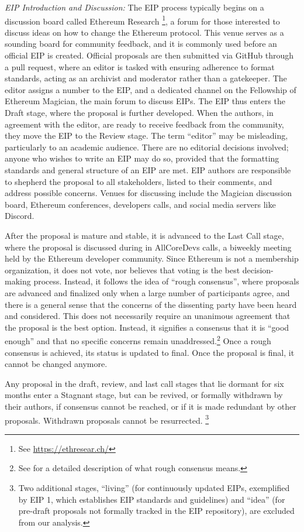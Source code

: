 \documentclass[No]{AEA}
\begin{document}
\textit{EIP Introduction and Discussion:} The EIP process typically begins on a discussion board called Ethereum Research \footnote{See \url{https://ethresear.ch/}}, a forum for those interested to discuss ideas on how to change the Ethereum protocol. This venue serves as a sounding board for community feedback, and it is commonly used before an official EIP is created. Official proposals are then submitted via GitHub through a pull request, where an editor is tasked with ensuring adherence to format standards, acting as an archivist and moderator rather than a gatekeeper. The editor assigns a number to the EIP, and a dedicated channel on the Fellowship of Ethereum Magician, the main forum to discuss EIPs. The EIP thus enters the Draft stage, where the proposal is further developed. When the authors, in agreement with the editor, are ready to receive feedback from the community, they move the EIP to the Review stage. The term ``editor'' may be misleading, particularly to an academic audience. There are no editorial decisions involved; anyone who wishes to write an EIP may do so, provided that the formatting standards and general structure of an EIP are met. EIP authors are responsible to shepherd the proposal to all stakeholders, listed to their comments, and address possible concerns. Venues for discussing include the Magician discussion board, Ethereum conferences, developers calls, and social media servers like Discord. 

After the proposal is mature and stable, it is advanced to the Last Call stage, where the proposal is discussed during in AllCoreDevs calls, a biweekly meeting held by the Ethereum developer community. Since Ethereum is not a membership organization, it does not vote, nor believes that voting is the best decision-making process. Instead, it follows the idea of ``rough consensus'', where proposals are advanced and finalized only when a large number of participants agree, and there is a general sense that the concerns of the dissenting party have been heard and considered. This does not necessarily require an unanimous agreement that the proposal is the best option. Instead, it signifies a consensus that it is ``good enough'' and that no specific concerns remain unaddressed.\footnote{See \cite{Resnick2014} for a detailed description of what rough consensus means.} Once a rough consensus is achieved, its status is updated to final. Once the proposal is final, it cannot be changed anymore.

Any proposal in the draft, review, and last call stages that lie dormant for six months enter a Stagnant stage, but can be revived, or formally withdrawn by their authors, if consensus cannot be reached, or if it is made redundant by other proposals. Withdrawn proposals cannot be resurrected. \footnote{Two additional stages, ``living'' (for continuously updated EIPs, exemplified by EIP 1, which establishes EIP standards and guidelines) and ``idea'' (for pre-draft proposals not formally tracked in the EIP repository), are excluded from our analysis.} 
\end{document}
